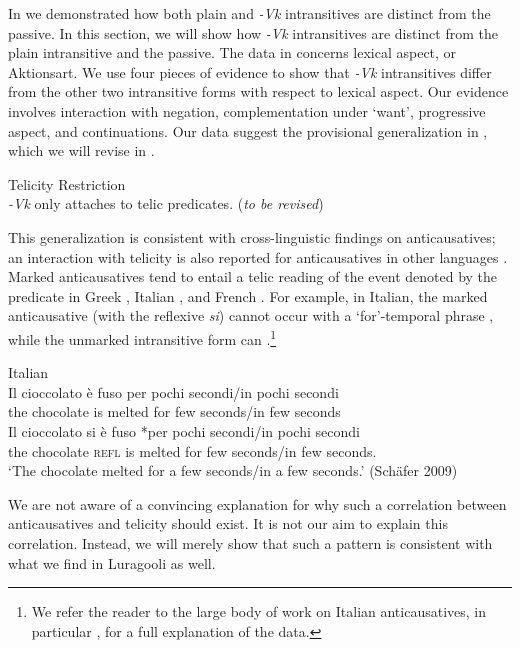 \documentclass[output=paper]{langsci/langscibook}
\begin{document}
In  we demonstrated how both plain and \textit{-Vk} intransitives are distinct from the passive. In this section, we will show how \textit{-Vk} intransitives are distinct from the plain intransitive and the passive. The data in  concerns lexical aspect, or Aktionsart. We use four pieces of evidence to show that \textit{-Vk} intransitives differ from the other two intransitive forms with respect to lexical aspect. Our evidence involves interaction with negation, complementation under ‘want’, progressive aspect, and continuations. Our data suggest the provisional generalization in , which we will revise in .

\ea\label{ex:gluckman:10} 
{{Telicity Restriction}}\\
 \textit{-Vk} only attaches to telic predicates. (\textit{to be revised})
\z

This generalization is consistent with cross-linguistic findings on anticausatives; an interaction with telicity is also reported for anticausatives in other languages \citep{Labelle1992,Folli2002,FolliHarley2005}. Marked anticausatives tend to entail a telic reading of the event denoted by the predicate in Greek \citep{AlexiadouAnagnostopoulou2004}, Italian \citep{Folli2002}, and French \citep{ZribiHertz1987}. For example, in Italian, the marked anticausative (with the reflexive \textit{si}) cannot occur with a ‘for’-temporal phrase , while the unmarked intransitive form can .\footnote{We refer the reader to the large body of work on Italian anticausatives, in particular \citet{Folli2002}, for a full explanation of the data.}

\ea\label{ex:gluckman:11}
  {Italian}\\
  \ea\label{ex:gluckman:11a}
  \gll  Il   cioccolato è  fuso     per pochi secondi/in pochi secondi\\
	the chocolate  is melted for few    seconds/in few    seconds\\
  \ex       \label{ex:gluckman:11b}
  \gll   Il    cioccolato si     è  fuso     *per pochi secondi/in pochi secondi\\
	the chocolate  \textsc{refl} is melted  for   few   seconds/in few seconds. \\
  \glt ‘The chocolate melted for a few seconds/in a few seconds.’     (Schäfer 2009)
  \z
\z

We are not aware of a convincing explanation for why such a correlation between anticausatives and telicity should exist. It is not our aim to explain this correlation. Instead, we will merely show that such a pattern is consistent with what we find in Luragooli as well. 
\end{document}
